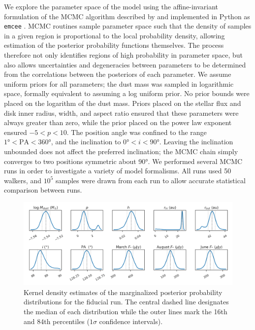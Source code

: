 \documentclass[modern]{aastex62}
\begin{document}
We explore the parameter space of the model using the affine-invariant formulation of the MCMC algorithm described by \cite{goodmanweare10} and implemented in Python as \texttt{emcee} \citep{foreman-mackey13}.  
MCMC routines sample parameter space such that the density of samples in a given region is proportional to the local probability density, allowing estimation of the posterior probability functions themselves.
The process therefore not only identifies regions of high probability in parameter space, but also allows uncertainties and degeneracies between parameters to be determined from the correlations between the posteriors of each parameter. 
We assume uniform priors for all parameters; the dust mass was sampled in logarithmic space, formally equivalent to assuming a log uniform prior.
No prior bounds were placed on the logarithm of the dust mass.
Priors placed on the stellar flux and disk inner radius, width, and aspect ratio ensured that these parameters were always greater than zero, while the prior placed on the power law exponent ensured $-5 < p < 10$.
The position angle was confined to the range $\ang{1} < \text{PA} < \ang{360}$, and the inclination to $\ang{0} < i < \ang{90}$.
Leaving the inclination unbounded does not affect the preferred inclination; the MCMC chain simply converges to two positions symmetric about \ang{90}.
We performed several MCMC runs in order to investigate a variety of model formalisms. 
All runs used 50 walkers, and $10^5$ samples were drawn from each run to allow accurate statistical comparison between runs.


\begin{figure}
  \centering
  \includegraphics[width=\linewidth]{../figures/fiducial_kde}
  \caption{Kernel density estimates of the marginalized posterior probability distributions for the fiducial run. The central dashed line designates the median of each distribution while the outer lines mark the 16th and 84th percentiles ($1\sigma$ confidence intervals).}
  \label{fig: kde}
\end{figure}
\end{document}
